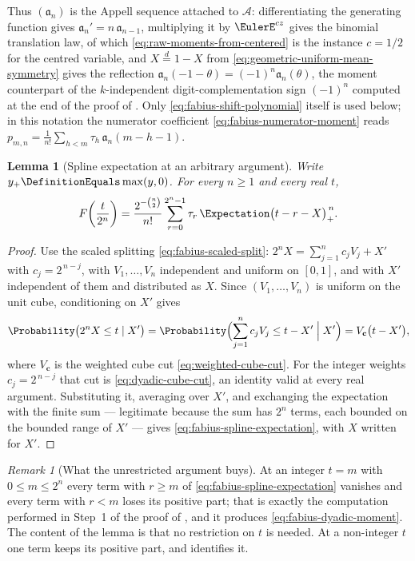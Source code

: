 \documentclass[11pt,a4paper,oneside,openany]{book}
\newtheorem{lemma}[lemma]{Lemma}
\theoremstyle{definition}
\theoremstyle{remark}
\newtheorem{remark}[remark]{Remark}
\begin{document}
Thus $(\mathfrak a_n)$ is the Appell sequence attached to $\mathcal A$: differentiating
the generating function gives $\mathfrak a_n'=n\,\mathfrak a_{n-1}$, multiplying it by
$\EulerE^{cz}$ gives the binomial translation law, of which
\eqref{eq:raw-moments-from-centered} is the instance $c=1/2$ for the centred variable,
and $X\overset d=1-X$ from \eqref{eq:geometric-uniform-mean-symmetry} gives the
reflection $\mathfrak a_n(-1-\theta)=(-1)^n\mathfrak a_n(\theta)$, the moment
counterpart of the $k$-independent digit-complementation sign $(-1)^n$ computed at the
end of the proof of .  Only
\eqref{eq:fabius-shift-polynomial} itself is
used below; in this notation the numerator coefficient
\eqref{eq:fabius-numerator-moment} reads
$p_{m,n}=\frac1{n!}\sum_{h<m}\tau_h\,\mathfrak a_n(m-h-1)$.

\begin{lemma}[Spline expectation at an arbitrary argument]\label{lem:fabius-spline-expectation}
Write $y_+\DefinitionEquals\max(y,0)$.  For every $n\ge1$ and every real $t$,
\begin{equation}\label{eq:fabius-spline-expectation}
 F\!\left(\frac t{2^n}\right)
 =\frac{2^{-\binom n2}}{n!}\sum_{r=0}^{2^n-1}\tau_r\,
   \Expectation\bigl(t-r-X\bigr)_+^{\,n}.
\end{equation}
\end{lemma}

\begin{proof}
Use the scaled splitting \eqref{eq:fabius-scaled-split}:
$2^nX=\sum_{j=1}^{n}c_jV_j+X'$ with $c_j=2^{\,n-j}$, with $V_1,\ldots,V_n$ independent
and uniform on $[0,1]$, and with $X'$ independent of them and distributed as $X$.  Since
$(V_1,\ldots,V_n)$ is uniform on the unit cube, conditioning on $X'$ gives
\[
 \Probability\bigl(2^nX\le t\mid X'\bigr)
 =\Probability\Bigl(\sum_{j=1}^{n}c_jV_j\le t-X'\;\Big|\;X'\Bigr)
 =V_{\mathbf c}\bigl(t-X'\bigr),
\]
where $V_{\mathbf c}$ is the weighted cube cut \eqref{eq:weighted-cube-cut}.  For the
integer weights $c_j=2^{\,n-j}$ that cut is \eqref{eq:dyadic-cube-cut}, an identity
valid at every real argument.  Substituting it, averaging over $X'$, and exchanging the
expectation with the finite sum --- legitimate because the sum has $2^n$ terms, each
bounded on the bounded range of $X'$ --- gives \eqref{eq:fabius-spline-expectation},
with $X$ written for $X'$.
\end{proof}

\begin{remark}[What the unrestricted argument buys]\label{rem:spline-expectation-scope}
At an integer $t=m$ with $0\le m\le2^n$ every term with $r\ge m$ of
\eqref{eq:fabius-spline-expectation} vanishes and every term with $r<m$ loses its
positive part; that is exactly the computation performed in Step~1 of the proof of
, and it produces \eqref{eq:fabius-dyadic-moment}.
The content of the lemma is that no restriction on $t$ is needed.  At a non-integer $t$
one term keeps its positive part, and  identifies it.
\end{remark}
\end{document}
